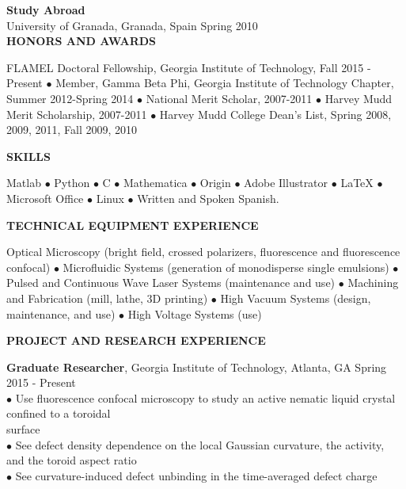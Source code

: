 \documentclass[10pt]{article}
\newenvironment{changemargin}[2]{%
  \list{}{\rightmargin#2\leftmargin#1
    \parsep=0pt\topsep=1pt\partopsep=0pt}
\item[]} {\endlist}
\newenvironment{indentmore}{\begin{changemargin}{10pt}{0cm}}{\end{changemargin}}
\begin{document}
\vspace{5pt}
\textbf{Study Abroad} \\
\hspace*{10pt}University of Granada, Granada, Spain \hfill Spring 2010\\


\textbf{\large HONORS AND AWARDS}
\begin{indentmore}
FLAMEL Doctoral Fellowship, Georgia Institute of Technology, Fall 2015 - Present $\bullet$  Member, Gamma Beta Phi, Georgia Institute of Technology Chapter, Summer 2012-Spring 2014 $\bullet$ National Merit Scholar, 2007-2011 $\bullet$ Harvey Mudd Merit Scholarship, 2007-2011 $\bullet$ Harvey Mudd College Dean's List, Spring 2008, 2009, 2011, Fall 2009, 2010
\end{indentmore}

\vspace{10pt}
\textbf{\large SKILLS}
\begin{indentmore}
Matlab  $\bullet$ Python $\bullet$ C $\bullet$ Mathematica $\bullet$
Origin
$\bullet$ Adobe Illustrator $\bullet$ LaTeX $\bullet$ Microsoft Office $\bullet$ Linux $\bullet$  Written and Spoken Spanish.
\end{indentmore}
\vspace{10pt}

\textbf{\large TECHNICAL EQUIPMENT EXPERIENCE}
\begin{indentmore}
Optical Microscopy (bright field, crossed polarizers, fluorescence and fluorescence confocal)
$\bullet$ Microfluidic Systems (generation of monodisperse single emulsions)
$\bullet$ Pulsed and Continuous Wave Laser Systems (maintenance and use)
$\bullet$ Machining and Fabrication (mill, lathe, 3D printing)
$\bullet$ High Vacuum Systems (design, maintenance, and use)
$\bullet$ High Voltage Systems (use)
\end{indentmore}
\vspace{10pt}

\textbf{\large PROJECT AND RESEARCH EXPERIENCE}

{\bf Graduate Researcher}, Georgia Institute of Technology, Atlanta, GA \hfill Spring 2015 - Present\\
\hspace*{10pt}$\bullet$ Use fluorescence confocal microscopy to study an active nematic liquid crystal confined to a toroidal\\ \hspace*{15pt} surface\\
\hspace*{10pt}$\bullet$ See defect density dependence on the local Gaussian curvature, the activity, and the toroid aspect ratio\\
\hspace*{10pt}$\bullet$ See curvature-induced defect unbinding in the time-averaged defect charge\\
\end{document}
